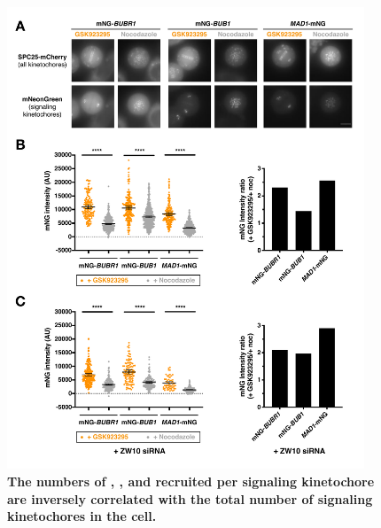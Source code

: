 \begin{figure} [b!]
    \centering
    \includegraphics[width=0.95\textwidth]{chapters/figures/SACProteinKinetochoreRecruitment.pdf}
    \caption{\textbf{The numbers of , , and  recruited per signaling kinetochore are inversely correlated with the total number of signaling kinetochores in the cell.}}
    \label{SACProteinKinetochoreRecruitment}
\end{figure}

